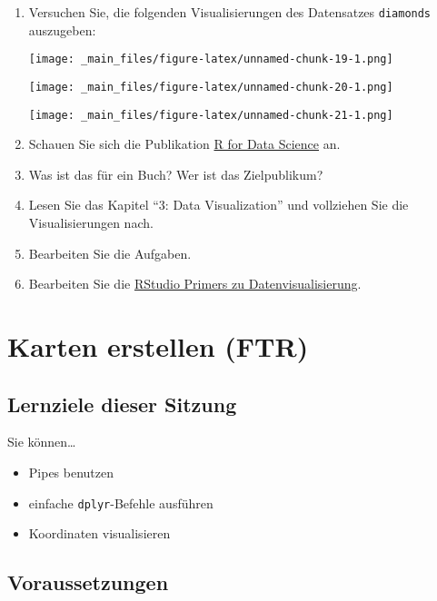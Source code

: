 \documentclass[11pt,german,a4paper]{article}
\providecommand{\tightlist}{%
  \setlength{\itemsep}{0pt}\setlength{\parskip}{0pt}}
\begin{document}
\begin{enumerate}
\def\labelenumi{\arabic{enumi}.}
\item
  Versuchen Sie, die folgenden Visualisierungen des Datensatzes \texttt{diamonds} auszugeben:

  \texttt{[image: \_main\_files/figure-latex/unnamed-chunk-19-1.png]}

  \texttt{[image: \_main\_files/figure-latex/unnamed-chunk-20-1.png]}

  \texttt{[image: \_main\_files/figure-latex/unnamed-chunk-21-1.png]}
\item
  Schauen Sie sich die Publikation \href{https://r4ds.had.co.nz/}{R for Data Science} an.
\item
  Was ist das für ein Buch? Wer ist das Zielpublikum?
\item
  Lesen Sie das Kapitel ``3: Data Visualization'' und vollziehen Sie die Visualisierungen nach.
\item
  Bearbeiten Sie die Aufgaben.
\item
  Bearbeiten Sie die \href{https://rstudio.cloud/learn/primers/3}{RStudio Primers zu Datenvisualisierung}.
\end{enumerate}

\hypertarget{karten-erstellen-ftr}{%
\section{Karten erstellen (FTR)}\label{karten-erstellen-ftr}}

\hypertarget{lernziele-dieser-sitzung-1}{%
\subsection{Lernziele dieser Sitzung}\label{lernziele-dieser-sitzung-1}}

Sie können\ldots{}

\begin{itemize}
\tightlist
\item
  Pipes benutzen
\item
  einfache \texttt{dplyr}-Befehle ausführen
\item
  Koordinaten visualisieren
\end{itemize}

\hypertarget{voraussetzungen-1}{%
\subsection{Voraussetzungen}\label{voraussetzungen-1}}
\end{document}
